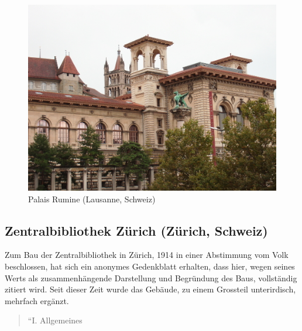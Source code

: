 \documentclass[a4paper,
fontsize=11pt,
oneside,
numbers=noperiodatend,
parskip=half-,
bibliography=totoc,
final
]{scrartcl}
\begin{document}
\begin{figure}[htbp]
\centering
\includegraphics{./img/018.jpg}
\caption{Palais Rumine (Lausanne,
Schweiz)}
\end{figure}

\subsection*{Zentralbibliothek Zürich (Zürich,
Schweiz)}\label{zentralbibliothek-zuxfcrich-zuxfcrich-schweiz}

Zum Bau der Zentralbibliothek in Zürich, 1914 in einer Abstimmung vom
Volk beschlossen, hat sich ein anonymes Gedenkblatt erhalten, dass hier,
wegen seines Werts als zusammenhängende Darstellung und Begründung des
Baus, vollständig zitiert wird. Seit dieser Zeit wurde das Gebäude, zu
einem Grossteil unterirdisch, mehrfach ergänzt.

\begin{quote}
``I. Allgemeines
\end{quote}
\end{document}

